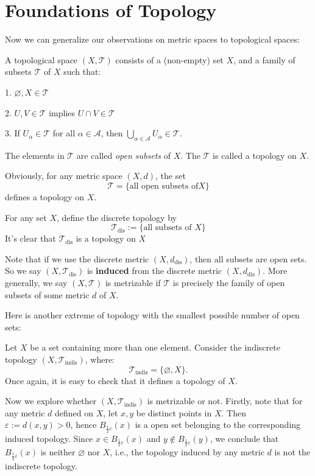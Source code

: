 
\chapter{Foundations of Topology}
Now we can generalize our observations on metric spaces to topological spaces:
\begin{definition} A topological space $(X, \mathcal{T})$ consists of a (non-empty) set \(X\), and a family of subsets $\mathcal{T}$ of \(X\) such that:

1. \(\varnothing,X \in  \mathcal{T}\)

2. \(U,V \in  \mathcal{T}\) implies \(U \cap  V \in  \mathcal{T}\)

3. If \({U}_{\alpha} \in  \mathcal{T}\) for all \(\alpha  \in  \mathcal{A}\), then \(\mathop{\bigcup}\limits_{{\alpha  \in  \mathcal{A}}}{U}_{\alpha} \in  \mathcal{T}\).

The elements in \(\mathcal{T}\) are called \emph{open subsets} of \(X\). The \(\mathcal{T}\) is called a topology on \(X\).
\end{definition}

Obviously, for any metric space $(X,d)$, the set
\[
\mathcal{T} = \{ \text{all open subsets of}X\}
\]
defines a topology on \(X\).

\begin{definition} 
For any set $X$, define the discrete topology by
\[
\mathcal{T}_{\mathrm{dis}} := \{ \text{all subsets of }X\}
\]
It’s clear that \(\mathcal{T}_{\mathrm{dis}}\) is a topology on \(X\)
\end{definition}
Note that if we use the discrete metric \(\left({X,d_{\mathrm{dis}}}\right)\), then all subsets are open sets. So we say 
$(X, \mathcal{T}_{\mathrm{dis}})$ is {\bf induced} from the discrete metric $(X, d_{\mathrm{dis}})$. More generally, we say $(X,\mathcal{T})$ is metrizable if \(\mathcal{T}\) is precisely the family of open subsets of some metric $d$ of $X$.

Here is another extreme of topology with the smallest possible number of open sets:
\begin{example}
Let \(X\) be a set containing more than one element. Consider the indiscrete topology \(\left({X,{\mathcal{T}}_{\text{indis}}}\right)\), where:
\[
{\mathcal{T}}_{\text{indis}} = \{ \varnothing,X\} \text{.}
\]
Once again, it is easy to check that it defines a topology of $X$. 

Now we explore whether \(\left({X,{\mathcal{T}}_{\text{indis}}}\right)\) is metrizable or not. Firstly, note that for any metric \(d\) defined on \(X\), let \(x,y\) be distinct points in \(X\). Then \(\varepsilon  := d\left({x,y}\right)  > 0\), hence \({B}_{\frac{1}{2}\varepsilon}\left(x\right)\) is a open set belonging to the corresponding induced topology. Since \(x \in  {B}_{\frac{1}{2}\varepsilon}\left(x\right)\) and \(y \notin  {B}_{\frac{1}{2}\varepsilon}\left(y\right)\), we conclude that \({B}_{\frac{1}{2}\varepsilon}\left(x\right)\) is neither \(\varnothing\) nor \(X\), i.e., the topology induced by any metric \(d\) is not the indiscrete topology.
\end{example}

